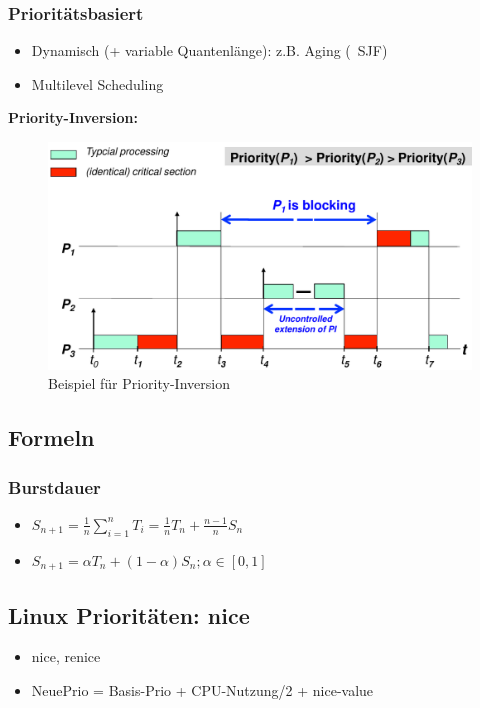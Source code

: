 \subsubsection{Prioritätsbasiert}
\begin{itemize}
    \item Dynamisch (+ variable Quantenlänge): z.B. Aging (~SJF)
    \item Multilevel Scheduling
\end{itemize}

\textbf{Priority-Inversion:}
\begin{figure}[ht!]
    \includegraphics[scale=.3]{pics/priority_inversion}
    \caption{Beispiel für Priority-Inversion}
\end{figure}

\subsection{Formeln}
\subsubsection{Burstdauer}
\begin{itemize}
    \item $S_{n+1} = \frac{1}{n} \sum_{i=1}^n T_i = \frac{1}{n} T_n + \frac{n-1}{n} S_n$
    \item $S_{n+1} = \alpha T_n + (1-\alpha) S_n; \alpha \in [0,1]$
\end{itemize}

\subsection{Linux Prioritäten: nice}
\begin{itemize}
    \item nice, renice
    \item NeuePrio = Basis-Prio + CPU-Nutzung/2 + nice-value
\end{itemize}